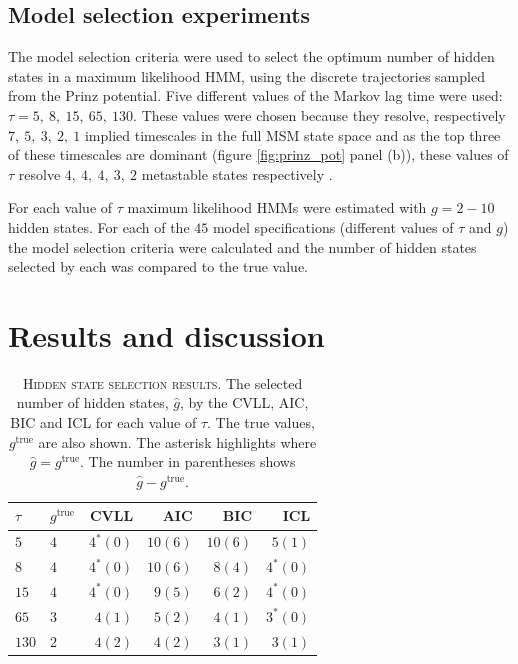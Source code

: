 \subsection{Model selection experiments}
The model selection criteria were used to select the optimum number of hidden states in a maximum likelihood HMM, using the discrete trajectories sampled from the Prinz potential. Five different values of the Markov lag time were used: $\tau=5,\ 8,\ 15,\ 65,\ 130$. These values were chosen because they resolve, respectively $7,\ 5,\ 3,\ 2,\ 1$ implied timescales in the full MSM state space and as the top three of these timescales are dominant (figure \ref{fig:prinz_pot} panel (b)), these values of $\tau$ resolve $4,\ 4,\ 4,\ 3,\ 2$ metastable states  respectively \cite{noeProjectedHiddenMarkov2013a}.

For each value of $\tau$ maximum likelihood HMMs were estimated with $g = 2 - 10$ hidden states. For each of the $45$ model specifications (different values of $\tau$ and $g$) the model selection criteria were calculated  and the number of hidden states selected by each was compared to the true value. 

\section{Results and discussion}\label{sec:hmm_results}
\begin{table}
    \centering
    \caption[Hidden state selection results]{\textsc{Hidden state selection results}. The selected number of hidden states, $\hat{g}$, by the CVLL, AIC, BIC and ICL for each value of $\tau$. The true values, $g^{\mathrm{true}}$ are also shown. The asterisk highlights where $\hat{g}=g^{\mathrm{true}}$. The number in parentheses shows $\hat{g}-g^{\mathrm{true}}$. }
    \begin{tabular}{llrrrr}
    \toprule
    $\tau$ & $g^{\mathrm{true}}$ & CVLL & AIC & BIC & ICL  \\
    \midrule
     $5$  & $4$ & $4^{*} (0)$  & $10 (6)$ & $10 (6)$ & $5 (1)$ \\
     $8$  & $4$ & $4^{*} (0)$ & $10 (6)$ & $8 (4)$  & $4^{*} (0)$  \\
     $15$ & $4$ & $4^{*} (0)$  & $9 (5)$ & $6 (2)$  & $4^{*} (0)$  \\
     $65 $& $3$ & $4 (1)$  & $5 (2)$  & $4 (1)$  & $3^{*} (0)$  \\
     $130$& $2$ & $4 (2)$  & $4 (2)$  & $3 (1)$  & $3 (1)$  \\
     \bottomrule
    \end{tabular}
    \label{tab:prinz_criteria_results}
\end{table}


